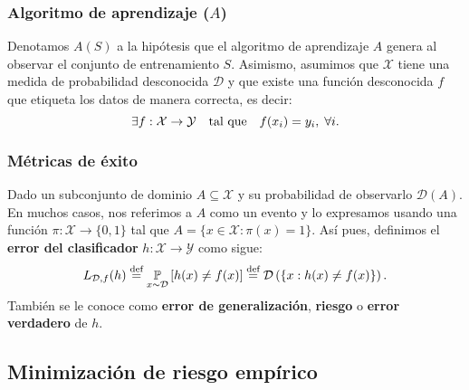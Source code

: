 \documentclass[8pt,a4paper]{extarticle}
\begin{document}
\begin{multicols}{3}
\subsubsection*{Algoritmo de aprendizaje ($A$)}

Denotamos $A(S)$ a la hipótesis que el algoritmo de aprendizaje $A$ genera al observar el conjunto de entrenamiento $S$. Asimismo, asumimos que $\mathcal{X}$ tiene una medida de probabilidad desconocida $\mathcal{D}$ y que existe una función desconocida $f$ que etiqueta los datos de manera correcta, es decir:
\[
	\exists f:\mathcal{X}\to \mathcal{Y}\quad \text{\normalfont tal que} \quad f(x_i) = y_i,\; \forall i
.\] 

\subsubsection*{Métricas de éxito}

\begin{boxdef}
	Dado un subconjunto de dominio $A \subseteq \mathcal{X}$ y su probabilidad de observarlo $\mathcal{D}(A)$. En muchos casos, nos referimos a $A$ como un evento y lo expresamos usando una función $\pi : \mathcal{X} \to \{0,1\}$ tal que $A = \{x \in \mathcal{X} : \pi(x) = 1\} $. Así pues, definimos el \textbf{error del clasificador} $h : \mathcal{X} \to \mathcal{Y}$ como sigue:
	\[
		L_{\mathcal{D}, f} (h) \stackrel{\text{\normalfont def}}{=} \underset{x \sim \mathcal{D}}{\mathbb{P}} \left[ h(x) \neq f(x) \right] \stackrel{\text{\normalfont def}}{=} \mathcal{D}\left( \{x : h(x) \neq f(x)\}  \right) 
	.\]
	También se le conoce como \textbf{error de generalización}, \textbf{riesgo} o \textbf{error verdadero} de $h$.
\end{boxdef}

\sectionbreak

\subsection{Minimización de riesgo empírico}



\vfill\eject
\columnbreak
\end{multicols}
\end{document}
